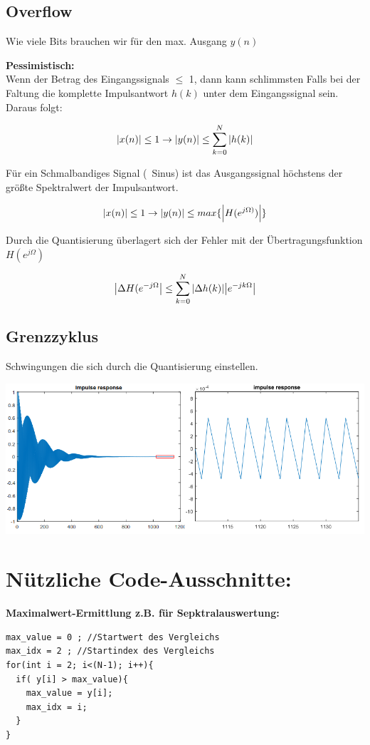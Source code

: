 \documentclass[10pt,a4paper]{article}
\begin{document}
\subsection{Overflow}
Wie viele Bits brauchen wir für den max. Ausgang $y(n)$

\textbf{Pessimistisch:}\\
Wenn der Betrag des Eingangssignals $\leq$ 1, dann kann schlimmsten Falls
bei der Faltung die komplette Impulsantwort $h(k)$ unter dem Eingangssignal sein. 
Daraus folgt:
  \begin{mdframed}[style=exercise]
    \begin{align}
        \abs{x(n)} \leq 1 \rightarrow \abs{y(n)} \leq \sum_{k=0}^N \abs{h(k)}
    \end{align}
  \end{mdframed}

Für ein Schmalbandiges Signal (~Sinus) ist das Ausgangssignal höchstens der größte Spektralwert der Impulsantwort.
  \begin{mdframed}[style=exercise]
    \begin{align}
        \abs{x(n)} \leq 1 \rightarrow \abs{y(n)} \leq max\{\abs{H(e^{j\Omega)})}\}
    \end{align}
  \end{mdframed}
  
Durch die Quantisierung überlagert sich der Fehler mit der Übertragungsfunktion $H(e^{j\Omega})$
  \begin{mdframed}[style=exercise]
    \begin{align}
        \abs{\Delta H(e^{-j\Omega}} \leq  \sum_{k=0}^N \abs{ \Delta h(k) } \abs{ e^{-jk\Omega} }
    \end{align}
  \end{mdframed}



\subsection{Grenzzyklus}
Schwingungen die sich durch die Quantisierung einstellen.
\begin{center}
    \includegraphics[width=.4\textwidth]{./img/grenzzyklus.png}
\end{center}

\section{Nützliche Code-Ausschnitte:}
\textbf{Maximalwert-Ermittlung z.B. für Sepktralauswertung:}
\begin{verbatim}
max_value = 0 ; //Startwert des Vergleichs
max_idx = 2 ; //Startindex des Vergleichs
for(int i = 2; i<(N-1); i++){ 
  if( y[i] > max_value){
    max_value = y[i];
    max_idx = i;
  }
}
\end{verbatim}
\end{document}
